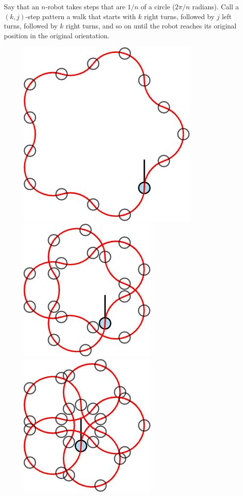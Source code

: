 \documentclass{article}
\begin{document}
Say that an $n$-robot takes steps that are $1/n$ of a circle ($2\pi/n$ radians).
Call a $(k, j)$-step pattern a walk that starts with $k$ right turns, followed
by $j$ left turns, followed by $k$ right turns, and so on until the robot
reaches its original position in the original orientation.
\begin{figure}[ht!]
  \centering
  \includegraphics[scale=0.18]{assets/069_problem_robot_walks/5-robot_1_2.png}
  \includegraphics[scale=0.18]{assets/069_problem_robot_walks/5-robot_1_3.png}
  \includegraphics[scale=0.18]{assets/069_problem_robot_walks/5-robot_1_4.png}

\end{figure}
\end{document}

